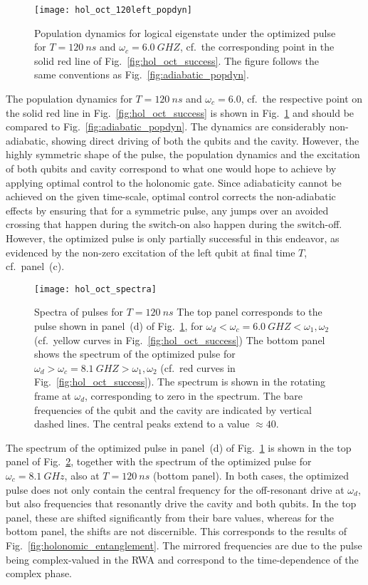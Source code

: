 \begin{figure}[p]
  \centering
  \texttt{[image: hol\_oct\_120left\_popdyn]}
  \caption{Population dynamics for logical eigenstate  under the
  optimized pulse for $T=\SI{120}{ns}$ and $\omega_c = \SI{6.0}{GHZ}$, cf.\ the
  corresponding point in the solid red line of Fig.~\ref{fig:hol_oct_success}.
  The figure follows the same conventions as Fig.~\ref{fig:adiabatic_popdyn}.
  }
  \label{fig:hol_oct_120left_popdyn}
\end{figure}
The population dynamics for $T=\SI{120}{ns}$ and $\omega_c = 6.0$, cf.~the
respective point on the solid red line in Fig.~\ref{fig:hol_oct_success} is
shown in Fig.~\ref{fig:hol_oct_120left_popdyn} and should be compared to
Fig.~\ref{fig:adiabatic_popdyn}. The dynamics are considerably non-adiabatic,
showing direct driving of both the qubits and the cavity. However, the highly
symmetric shape of the pulse, the population dynamics and the excitation of both
qubits and cavity correspond to what one would hope to achieve by applying
optimal control to the holonomic gate. Since adiabaticity cannot be achieved on
the given time-scale, optimal control corrects the non-adiabatic effects by
ensuring that for a symmetric pulse, any jumps over an avoided crossing that
happen during the switch-on also happen during the switch-off. However, the
optimized pulse is only partially successful in this endeavor, as evidenced by
the non-zero excitation of the left qubit at final time $T$, cf.\ panel~(c).

\begin{figure}[p]
  \centering
  \texttt{[image: hol\_oct\_spectra]}
  \caption{Spectra of  pulses for $T=\SI{120}{ns}$
  The top panel corresponds to the pulse shown in
  panel~(d) of Fig.~\ref{fig:hol_oct_120left_popdyn}, for
  $\omega_d < \omega_c = \SI{6.0}{GHZ} < \omega_1, \omega_2$
  (cf.\ yellow curves in Fig.~\ref{fig:hol_oct_success})
  The bottom panel  shows the spectrum of the optimized pulse for
  $\omega_d > \omega_c = \SI{8.1}{GHZ} > \omega_1, \omega_2$
  (cf.\ red curves in Fig.~\ref{fig:hol_oct_success}). The spectrum is shown in
  the rotating frame at $\omega_d$, corresponding to zero in the spectrum.
  The bare frequencies of the qubit and the cavity are indicated by vertical
  dashed lines. The central peaks extend to a value $\approx 40$.
  }
  \label{fig:hol_oct_spectra}
\end{figure}
The spectrum of the optimized pulse in panel~(d) of
Fig.~\ref{fig:hol_oct_120left_popdyn} is shown in the top panel of
Fig.~\ref{fig:hol_oct_spectra}, together with the spectrum of the optimized
pulse for $\omega_c = \SI{8.1}{GHz}$, also at $T=\SI{120}{ns}$ (bottom panel).
In both cases, the optimized pulse does not only contain the central frequency
for the off-resonant drive at $\omega_d$, but also frequencies that resonantly
drive the cavity and both qubits. In the top panel, these are shifted
significantly from their bare values, whereas for the bottom panel, the shifts
are not discernible. This corresponds to the results of
Fig.~\ref{fig:holonomic_entanglement}. The mirrored frequencies are due to the
pulse being complex-valued in the RWA and correspond to the time-dependence of
the complex phase.

